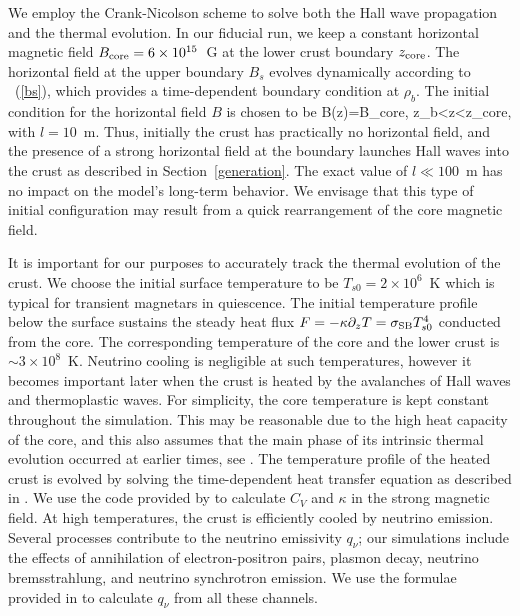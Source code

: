 We employ the Crank-Nicolson scheme \citep{press2007numerical} to solve both the Hall wave propagation and the thermal evolution.
In our fiducial run, we keep a constant horizontal magnetic field $B_{\rm core}=6\times 10^{15}$~G at the lower crust boundary $z_{\rm core}$. The horizontal field at the upper boundary $B_s$ evolves dynamically according to \Eq~(\ref{bs}), which provides a time-dependent boundary condition at $\rho_b$. 
The initial condition for the horizontal field $B$ is chosen to be
\beq
B(z)=B_{\rm core}\exp{},
\qquad z_b<z<z_{\rm core},
\eeq
with $l=10$~m. 
Thus, initially the crust has practically no horizontal field, and the presence of a strong horizontal field at the boundary launches Hall waves into the crust as 
described in Section~\ref{generation}.
The exact value of $l\ll 100$~m has no impact on the model's long-term behavior. 
We envisage that this type of initial configuration may result from a quick rearrangement of the core magnetic field.

It is important for our purposes to accurately track the thermal evolution of the crust. 
We choose the initial surface temperature to be $T_{s0}=2\times 10^6$~K which is typical for transient magnetars in quiescence.
The initial temperature profile below the surface sustains the steady heat flux $F=-\kappa\partial_z T=\sigma_{\rm SB} T_{s0}^4$ conducted from the core. 
The corresponding temperature of the core and the lower crust is $\sim 3\times 10^8$~K.
Neutrino cooling is negligible at such temperatures, however it becomes important later when the crust is heated by the avalanches of Hall waves and thermoplastic waves. 
For simplicity, the core temperature is kept constant throughout the simulation.
This may be reasonable due to the high heat capacity of the core, and this also
assumes that the main phase of its intrinsic thermal evolution occurred at 
earlier times, see \citet{2016ApJ...833..261B}.
The temperature profile of the heated crust is evolved by solving the time-dependent heat transfer equation as described in \citet{2015ApJ...815...25L}.
We use the code provided by \citet{1999A&A...351..787P} to calculate $C_V$ and $\kappa$ in the strong magnetic field. 
At high temperatures, the crust is efficiently cooled by neutrino emission.
Several processes contribute to the neutrino emissivity $q_\nu$; our simulations include the effects of annihilation of electron-positron pairs, plasmon decay, neutrino bremsstrahlung, and neutrino synchrotron emission. We use the formulae provided in \citet{2001PhR...354....1Y} to calculate $q_\nu$ from all these channels. 

